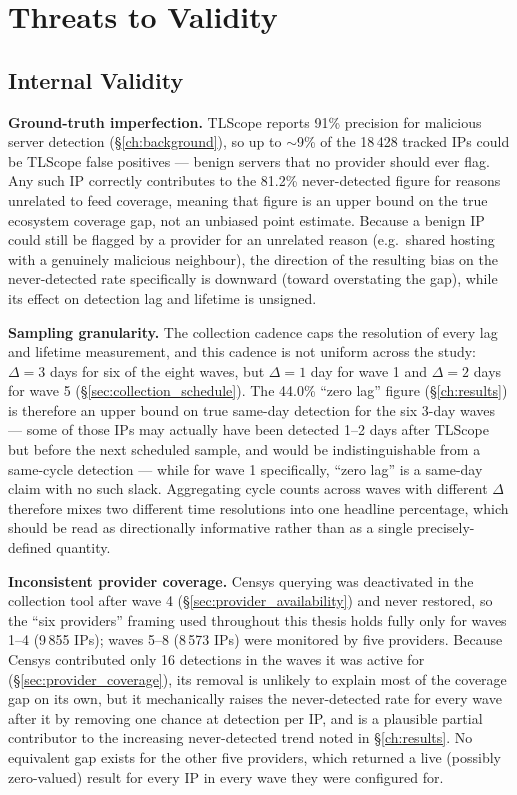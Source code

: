 \documentclass[12pt, a4paper, twoside]{report}
\begin{document}
\section{Threats to Validity}
\label{sec:threats_to_validity}

\subsection{Internal Validity}

\textbf{Ground-truth imperfection.} TLScope reports 91\% precision for malicious server detection
(\S\ref{ch:background}), so up to $\sim$9\% of the 18\,428 tracked IPs could be TLScope false
positives --- benign servers that no provider should ever flag. Any such IP correctly contributes to
the 81.2\% never-detected figure for reasons unrelated to feed coverage, meaning that figure is an
upper bound on the true ecosystem coverage gap, not an unbiased point estimate. Because a benign IP
could still be flagged by a provider for an unrelated reason (e.g.\ shared hosting with a genuinely
malicious neighbour), the direction of the resulting bias on the never-detected rate specifically is
downward (toward overstating the gap), while its effect on detection lag and lifetime is unsigned.

\textbf{Sampling granularity.} The collection cadence caps the resolution of every lag and lifetime
measurement, and this cadence is not uniform across the study: $\Delta = 3$ days for six of the
eight waves, but $\Delta = 1$ day for wave 1 and $\Delta = 2$ days for wave 5
(\S\ref{sec:collection_schedule}). The 44.0\% ``zero lag'' figure (\S\ref{ch:results}) is therefore
an upper bound on true same-day detection for the six 3-day waves --- some of those IPs may
actually have been detected 1--2 days after TLScope but before the next scheduled sample, and would
be indistinguishable from a same-cycle detection --- while for wave 1 specifically, ``zero lag''
is a same-day claim with no such slack. Aggregating cycle counts across waves with different
$\Delta$ therefore mixes two different time resolutions into one headline percentage, which should
be read as directionally informative rather than as a single precisely-defined quantity.

\textbf{Inconsistent provider coverage.} Censys querying was deactivated in the collection tool
after wave 4 (\S\ref{sec:provider_availability}) and never restored, so the ``six providers''
framing used throughout this thesis holds fully only for waves 1--4 (9\,855 IPs); waves 5--8
(8\,573 IPs) were monitored by five providers. Because Censys contributed only 16 detections in the
waves it was active for (\S\ref{sec:provider_coverage}), its removal is unlikely to explain most of
the coverage gap on its own, but it mechanically raises the never-detected rate for every wave after
it by removing one chance at detection per IP, and is a plausible partial contributor to the
increasing never-detected trend noted in \S\ref{ch:results}. No equivalent gap exists for the other
five providers, which returned a live (possibly zero-valued) result for every IP in every wave they
were configured for.
\end{document}
